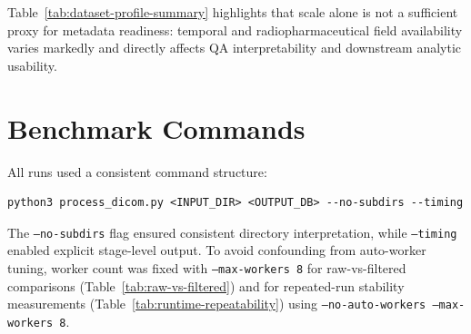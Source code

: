 \begin{table}[htbp]
\centering
\caption{Dataset profile summary for readers without direct dataset access.}
\label{tab:dataset-profile-summary}
\end{table}

Table~\ref{tab:dataset-profile-summary} highlights that scale alone is not a sufficient proxy for metadata readiness: temporal and radiopharmaceutical field availability varies markedly and directly affects QA interpretability and downstream analytic usability.

\section{Benchmark Commands}
All runs used a consistent command structure:
\begin{verbatim}
python3 process_dicom.py <INPUT_DIR> <OUTPUT_DB> --no-subdirs --timing
\end{verbatim}
The \texttt{--no-subdirs} flag ensured consistent directory interpretation, while \texttt{--timing} enabled explicit stage-level output. To avoid confounding from auto-worker tuning, worker count was fixed with \texttt{--max-workers 8} for raw-vs-filtered comparisons (Table~\ref{tab:raw-vs-filtered}) and for repeated-run stability measurements (Table~\ref{tab:runtime-repeatability}) using \texttt{--no-auto-workers --max-workers 8}.

